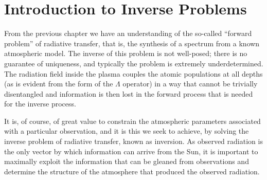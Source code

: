 \section{Introduction to Inverse Problems}\label{Sec:InverseProblems}

From the previous chapter we have an understanding of the so-called ``forward problem'' of radiative transfer, that is, the synthesis of a spectrum from a known atmospheric model.
The inverse of this problem is not well-posed; there is no guarantee of uniqueness, and typically the problem is extremely underdetermined.
The radiation field inside the plasma couples the atomic populations at all depths (as is evident from the form of the $\Lambda$ operator) in a way that cannot be trivially disentangled and information is then lost in the forward process that is needed for the inverse process.

It is, of course, of great value to constrain the atmospheric parameters associated with a particular observation, and it is this we seek to achieve, by solving the inverse problem of radiative transfer, known as inversion.
As observed radiation is the only vector by which information can arrive from the Sun, it is important to maximally exploit the information that can be gleaned from observations and determine the structure of the atmosphere that produced the observed radiation.


